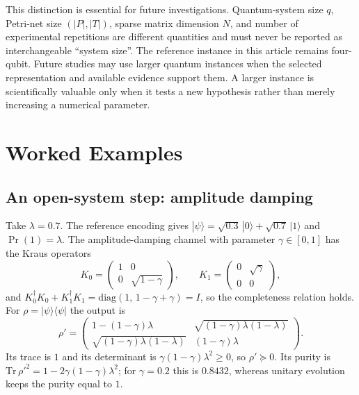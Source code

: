 \documentclass[final,3p,times]{elsarticle}
\begin{document}
This distinction is essential for future investigations. Quantum-system size $q$, Petri-net size $(|P|,|T|)$, sparse matrix dimension $N$, and number of experimental repetitions are different quantities and must never be reported as interchangeable ``system size''. The reference instance in this article remains four-qubit. Future studies may use larger quantum instances when the selected representation and available evidence support them. A larger instance is scientifically valuable only when it tests a new hypothesis rather than merely increasing a numerical parameter.

\section{Worked Examples}\label{sec:examples}
\subsection{An open-system step: amplitude damping}
Take $\lambda=0.7$. The reference encoding gives $|\psi\rangle=\sqrt{0.3}\,|0\rangle+\sqrt{0.7}\,|1\rangle$ and $\Pr(1)=\lambda$. The amplitude-damping channel with parameter $\gamma\in[0,1]$ has the Kraus operators
\begin{equation}
 K_0=\begin{pmatrix}1&0\\0&\sqrt{1-\gamma}\end{pmatrix},\qquad
 K_1=\begin{pmatrix}0&\sqrt{\gamma}\\0&0\end{pmatrix},
\end{equation}
and $K_0^\dagger K_0+K_1^\dagger K_1=\mathrm{diag}(1,\,1-\gamma+\gamma)=I$, so the completeness relation holds. For $\rho=|\psi\rangle\langle\psi|$ the output is
\begin{equation}
 \rho'=\begin{pmatrix}1-(1-\gamma)\lambda & \sqrt{(1-\gamma)\lambda(1-\lambda)}\\ \sqrt{(1-\gamma)\lambda(1-\lambda)} & (1-\gamma)\lambda\end{pmatrix}.
\end{equation}
Its trace is $1$ and its determinant is $\gamma(1-\gamma)\lambda^2\ge0$, so $\rho'\succeq0$. Its purity is $\mathrm{Tr}\,\rho'^2=1-2\gamma(1-\gamma)\lambda^2$; for $\gamma=0.2$ this is $0.8432$, whereas unitary evolution keeps the purity equal to $1$.
\end{document}
